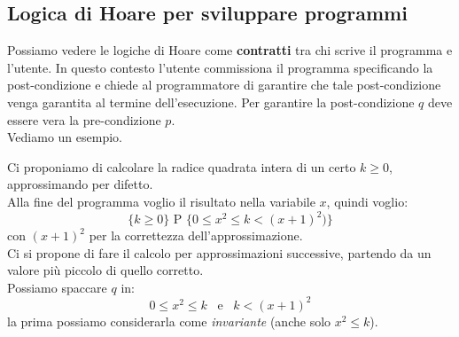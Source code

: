 				      					      			\subsection{Logica di Hoare per sviluppare programmi}
				      					      			Possiamo vedere le logiche di Hoare come \textbf{contratti} tra chi scrive il
				      					      			programma e l'utente. In questo contesto l'utente commissiona il programma
				      					      			specificando la post-condizione e chiede al programmatore di garantire che tale
				      					      			post-condizione venga garantita al termine dell'esecuzione. Per garantire la
				      					      			post-condizione $q$ deve essere vera la pre-condizione $p$.\\
				      					      			Vediamo un esempio.
				      					      			\begin{esempio}
				      					      				Ci proponiamo di calcolare la radice quadrata intera di un certo $k\geq 0$,
				      					      				approssimando per difetto.\\
				      					      				Alla fine del programma voglio il risultato nella variabile $x$, quindi
				      					      				voglio:
				      					      				\[\{k\geq 0\}\mbox{ P }\{0\leq x^2\leq k<(x+1)^2)\}\]
				      					      				con $(x+1)^2$ per la correttezza dell'approssimazione.\\
				      					      				Ci si propone di fare il calcolo per approssimazioni successive, partendo da
				      					      				un valore più piccolo di quello corretto.\\
				      					      				Possiamo spaccare $q$ in:
				      					      				\[0\leq x^2\leq k \,\,\,\mbox{ e }\,\,\,k<(x+1)^2\]
				      					      				la prima possiamo considerarla come \textit{invariante} (anche solo $x^2\leq
				      					      				k$).\\
				      					      								      					      				  

\end{esempio}
